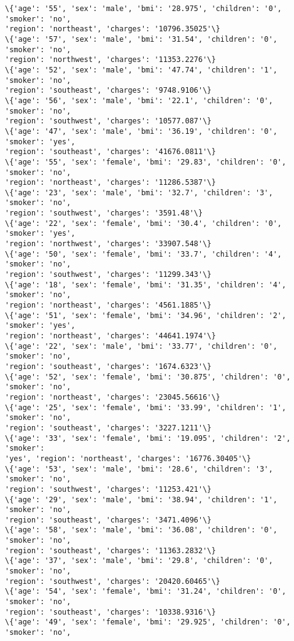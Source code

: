 \documentclass[11pt]{article}
\begin{document}
\begin{Verbatim}[commandchars=\\\{\}]
\{'age': '55', 'sex': 'male', 'bmi': '28.975', 'children': '0', 'smoker': 'no',
'region': 'northeast', 'charges': '10796.35025'\}
\{'age': '57', 'sex': 'male', 'bmi': '31.54', 'children': '0', 'smoker': 'no',
'region': 'northwest', 'charges': '11353.2276'\}
\{'age': '52', 'sex': 'male', 'bmi': '47.74', 'children': '1', 'smoker': 'no',
'region': 'southeast', 'charges': '9748.9106'\}
\{'age': '56', 'sex': 'male', 'bmi': '22.1', 'children': '0', 'smoker': 'no',
'region': 'southwest', 'charges': '10577.087'\}
\{'age': '47', 'sex': 'male', 'bmi': '36.19', 'children': '0', 'smoker': 'yes',
'region': 'southeast', 'charges': '41676.0811'\}
\{'age': '55', 'sex': 'female', 'bmi': '29.83', 'children': '0', 'smoker': 'no',
'region': 'northeast', 'charges': '11286.5387'\}
\{'age': '23', 'sex': 'male', 'bmi': '32.7', 'children': '3', 'smoker': 'no',
'region': 'southwest', 'charges': '3591.48'\}
\{'age': '22', 'sex': 'female', 'bmi': '30.4', 'children': '0', 'smoker': 'yes',
'region': 'northwest', 'charges': '33907.548'\}
\{'age': '50', 'sex': 'female', 'bmi': '33.7', 'children': '4', 'smoker': 'no',
'region': 'southwest', 'charges': '11299.343'\}
\{'age': '18', 'sex': 'female', 'bmi': '31.35', 'children': '4', 'smoker': 'no',
'region': 'northeast', 'charges': '4561.1885'\}
\{'age': '51', 'sex': 'female', 'bmi': '34.96', 'children': '2', 'smoker': 'yes',
'region': 'northeast', 'charges': '44641.1974'\}
\{'age': '22', 'sex': 'male', 'bmi': '33.77', 'children': '0', 'smoker': 'no',
'region': 'southeast', 'charges': '1674.6323'\}
\{'age': '52', 'sex': 'female', 'bmi': '30.875', 'children': '0', 'smoker': 'no',
'region': 'northeast', 'charges': '23045.56616'\}
\{'age': '25', 'sex': 'female', 'bmi': '33.99', 'children': '1', 'smoker': 'no',
'region': 'southeast', 'charges': '3227.1211'\}
\{'age': '33', 'sex': 'female', 'bmi': '19.095', 'children': '2', 'smoker':
'yes', 'region': 'northeast', 'charges': '16776.30405'\}
\{'age': '53', 'sex': 'male', 'bmi': '28.6', 'children': '3', 'smoker': 'no',
'region': 'southwest', 'charges': '11253.421'\}
\{'age': '29', 'sex': 'male', 'bmi': '38.94', 'children': '1', 'smoker': 'no',
'region': 'southeast', 'charges': '3471.4096'\}
\{'age': '58', 'sex': 'male', 'bmi': '36.08', 'children': '0', 'smoker': 'no',
'region': 'southeast', 'charges': '11363.2832'\}
\{'age': '37', 'sex': 'male', 'bmi': '29.8', 'children': '0', 'smoker': 'no',
'region': 'southwest', 'charges': '20420.60465'\}
\{'age': '54', 'sex': 'female', 'bmi': '31.24', 'children': '0', 'smoker': 'no',
'region': 'southeast', 'charges': '10338.9316'\}
\{'age': '49', 'sex': 'female', 'bmi': '29.925', 'children': '0', 'smoker': 'no',

\end{Verbatim}
\end{document}
